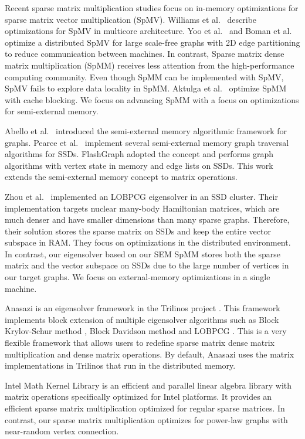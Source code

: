 Recent sparse matrix multiplication studies focus on in-memory optimizations
for sparse matrix vector multiplication (SpMV). Williams et al.~\cite{Williams07}
describe optimizations for SpMV in multicore architecture. Yoo et al.~\cite{Yoo11}
and Boman et al.~\cite{Boman2013} optimize a distributed SpMV for large
scale-free graphs with 2D edge partitioning to reduce communication between
machines. In contrast, Sparse matrix dense matrix multiplication (SpMM) receives
less attention from the high-performance computing community. Even though
SpMM can be implemented with SpMV, SpMV fails to explore data locality in SpMM.
Aktulga et al.~\cite{Aktulga14} optimize SpMM with cache blocking. We focus on
advancing SpMM with a focus on optimizations for semi-external memory.

Abello et al.~\cite{Abello98} introduced the semi-external memory algorithmic
framework for graphs. Pearce et al.~\cite{Pearce10} implement several 
semi-external memory graph traversal algorithms for SSDs. FlashGraph
\cite{flashgraph} adopted the concept and performs graph algorithms with
vertex state in memory and edge lists on SSDs. This work extends the semi-external
memory concept to matrix operations.

Zhou et al.~\cite{Zhou12} implemented an LOBPCG \cite{Arbenz05} eigensolver in
an SSD cluster. Their implementation targets nuclear many-body Hamiltonian
matrices, which are much denser and have smaller dimensions than many sparse
graphs. Therefore, their solution stores the sparse matrix on SSDs and keep
the entire vector subspace in RAM. They focus on optimizations
in the distributed environment. In contrast, our eigensolver based on our
SEM SpMM stores both
the sparse matrix and the vector subspace on SSDs due to the large number
of vertices in our target graphs. We focus on external-memory optimizations
in a single machine.

Anasazi \cite{anasazi} is an eigensolver framework in the Trilinos project
\cite{trilinos}. This framework implements block extension of multiple
eigensolver algorithms
such as Block Krylov-Schur method \cite{krylovschur}, Block Davidson method
\cite{Arbenz05} and LOBPCG \cite{Arbenz05}. This is a very flexible framework
that allows users to redefine sparse matrix dense matrix multiplication and
dense matrix operations. By default, Anasazi uses the matrix implementations
in Trilinos that run in the distributed memory.

Intel Math Kernel Library \cite{mkl} is an efficient and parallel linear
algebra library with matrix operations specifically optimized for Intel
platforms. It provides an efficient sparse matrix multiplication optimized
for regular sparse matrices. In contrast, our sparse matrix multiplication
optimizes for power-law graphs with near-random vertex connection.
